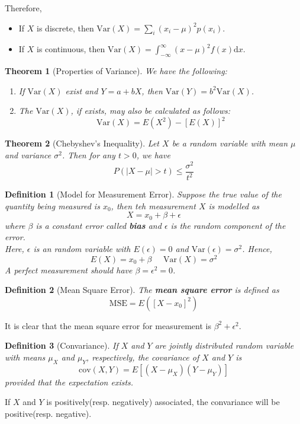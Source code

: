 \documentclass[12pt]{article}
\newcommand{\diff}{\mathrm{d}}
\newcommand{\var}{\mathrm{Var}}
\newcommand{\cov}{\mathrm{cov}}
\newtheorem{definition}{Definition}[section]
\newtheorem{theorem}{Theorem}[section]
\theoremstyle{definition}
\begin{document}
Therefore,
\begin{itemize}
  \item If $X$ is discrete, then $\var(X) = \sum_i (x_i-\mu)^2 p(x_i)$.
  \item If $X$ is continuous, then $\var(X) = \int_{-\infty}^\infty (x-\mu)^2 f(x)\diff x$.
\end{itemize}
\begin{theorem}[Properties of Variance]
\normalfont We have the following:
\begin{enumerate}
  \item If $\var(X)$ exist and $Y=a+bX$, then $\var(Y) = b^2\var(X)$.
  \item The $\var(X)$, if exists, may also be calculated as follows:
  \[
\var(X) = E(X^2)-[E(X)]^2
  \]
\end{enumerate}
\end{theorem}
\begin{theorem}[Chebyshev's Inequality]
\normalfont Let $X$ be a random variable with mean $\mu$ and variance $\sigma^2$. Then for any $t>0$, we have
\[
P(|X-\mu|>t)\leq \frac{\sigma^2}{t^2}
\]
\end{theorem}
\begin{definition}[Model for Measurement Error]
\normalfont Suppose the true value of the quantity being measured is $x_0$, then teh measurement $X$ is modelled as
\[
X=x_0+\beta+\epsilon
\]
where $\beta$ is a constant error called \textbf{bias} and $\epsilon$ is the random component of the error.\\
Here, $\epsilon$ is an random variable with $E(\epsilon)=0$ and $\var(\epsilon) = \sigma^2$. Hence, 
\[
E(X) = x_0+\beta\;\;\;\;\;\var(X)=\sigma^2
\]
A perfect measurement should have $\beta=\epsilon^2 = 0$.
\end{definition}
\begin{definition}[Mean Square Error]
\normalfont The \textbf{mean square error} is defined as
\[
\text{MSE} = E([X-x_0]^2)
\]
\end{definition}
It is clear that the mean square error for measurement is $\beta^2+\epsilon^2$.
\begin{definition}[Convariance]
\normalfont If $X$ and $Y$ are jointly distributed random variable with means $\mu_X$ and $\mu_Y$, respectively, the covariance of $X$ and $Y$ is
\[
\cov(X,Y) = E[(X-\mu_X)(Y-\mu_Y)]
\]
provided that the expectation exists.
\end{definition}
If $X$ and $Y$ is positively(resp. negatively) associated, the convariance will be positive(resp. negative).
\end{document}
